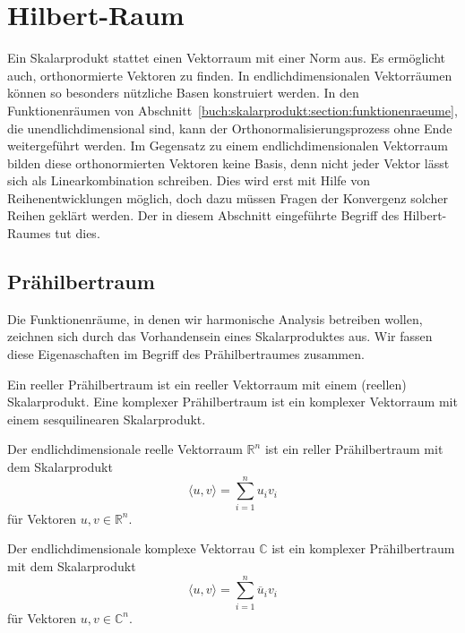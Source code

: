 %
%
%
\section{Hilbert-Raum
\label{buch:skalarprodukt:section:hilbertraum}}
Ein Skalarprodukt stattet einen Vektorraum mit einer Norm aus.
Es ermöglicht auch, orthonormierte Vektoren zu finden.
In endlichdimensionalen Vektorräumen können so besonders nützliche
Basen konstruiert werden.
In den Funktionenräumen von
Abschnitt~\ref{buch:skalarprodukt:section:funktionenraeume},
die unendlichdimensional sind, kann der Orthonormalisierungsprozess
ohne Ende weitergeführt werden.
Im Gegensatz zu einem endlichdimensionalen Vektorraum bilden diese
orthonormierten Vektoren keine Basis, denn nicht jeder Vektor lässt
sich als Linearkombination schreiben.
Dies wird erst mit Hilfe von Reihenentwicklungen möglich, doch dazu
müssen Fragen der Konvergenz solcher Reihen geklärt werden.
Der in diesem Abschnitt eingeführte Begriff des Hilbert-Raumes tut dies.

%
%
\subsection{Prähilbertraum}
Die Funktionenräume, in denen wir harmonische Analysis betreiben wollen,
zeichnen sich durch das Vorhandensein eines Skalarproduktes aus.
Wir fassen diese Eigenaschaften im Begriff des Prähilbertraumes
zusammen.

\begin{definition}[Prähilbertraum]
Ein reeller Prähilbertraum ist ein reeller Vektorraum mit einem
(reellen) Skalarprodukt.
%
Eine komplexer Prähilbertraum ist ein komplexer Vektorraum mit einem
sesquilinearen Skalarprodukt.
\end{definition}

\begin{beispiel}
Der endlichdimensionale reelle Vektorraum $\mathbb{R}^n$ ist ein
reller Prähilbertraum mit dem Skalarprodukt
\[
\langle u,v\rangle
=
\sum_{i=1}^n u_iv_i
\]
für Vektoren $u,v\in\mathbb{R}^n$.
\end{beispiel}

\begin{beispiel}
Der endlichdimensionale komplexe Vektorrau $\mathbb{C}$ ist ein
komplexer Prähilbertraum mit dem Skalarprodukt
\[
\langle u,v\rangle
=
\sum_{i=1}^n \overline{u}_iv_i
\]
für Vektoren $u,v\in\mathbb{C}^n$.
\end{beispiel}

